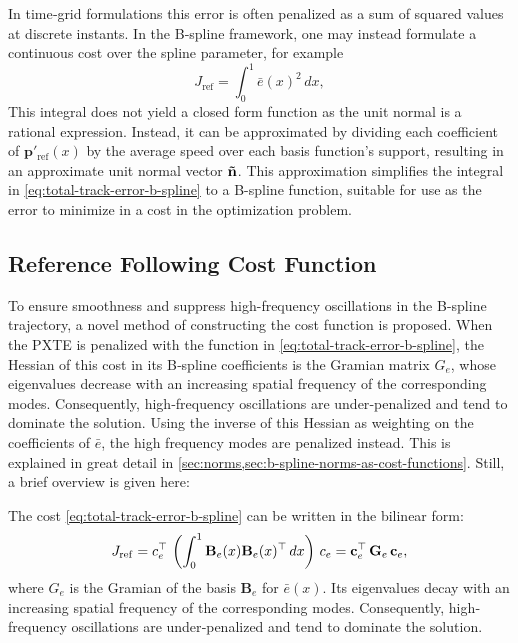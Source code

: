 In time‐grid formulations this error is often penalized as a sum of squared values at discrete instants. In the B‐spline framework, one may instead formulate a continuous cost over the spline parameter, for example
\begin{equation}\label{eq:total-track-error-b-spline}
J_\text{ref} = \int_0^1 \bar e(x)^2 \, dx,
\end{equation}
This integral does not yield a closed form function as the unit normal is a rational expression. Instead, it can be approximated by dividing each coefficient of $\mathbf p'_\text{ref}(x)$ by the average speed over each basis function's support, resulting in an approximate unit normal vector $\bf\tilde n$. This approximation simplifies the integral in \cref{eq:total-track-error-b-spline} to a B-spline function, suitable for use as the error to minimize in a cost in the optimization problem.






\subsection{Reference Following Cost Function}\label{sec:oscillations}
To ensure smoothness and suppress high-frequency oscillations in the B-spline trajectory, a novel method of constructing the cost function is proposed.
When the PXTE is penalized with the function in \cref{eq:total-track-error-b-spline}, 
the Hessian of this cost in its B‐spline coefficients is the Gramian matrix $G_e$, whose eigenvalues decrease with an increasing spatial frequency of the corresponding modes.  Consequently, high‐frequency oscillations are under‐penalized and tend to dominate the solution. Using the inverse of this Hessian as weighting on the coefficients of $\bar e$, the high frequency modes are penalized instead. This is explained in great detail in \cref{sec:norms,sec:b-spline-norms-as-cost-functions}. Still, a brief overview is given here:

The cost \cref{eq:total-track-error-b-spline} can be written in the bilinear form:
\begin{equation}\label{eq:cost-reference-following-bilinear}
  J_{\rm ref} = c_e^\top\,\left(\int_0^1 \mathbf B_e(x) \mathbf B_e(x)^\top \, dx\right)\,c_e =
  \mathbf c_e^\top\,\mathbf G_e\, \mathbf c_e,
\end{equation}
where \(G_e\) is the Gramian of the basis $\mathbf B_e$ for \(\bar e(x)\). Its eigenvalues decay with an increasing spatial frequency of the corresponding modes. Consequently, high‐frequency oscillations are under‐penalized and tend to dominate the solution.

